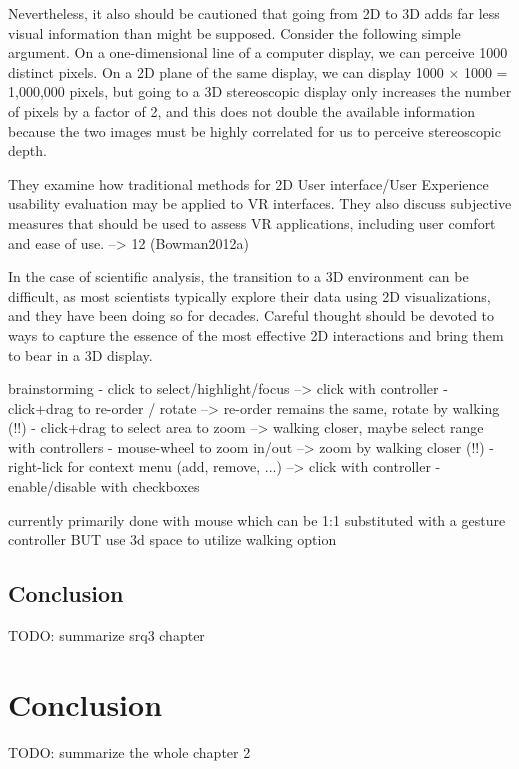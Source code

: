 Nevertheless, it also should be cautioned that going from 2D to 3D adds far less visual information than might be supposed. Consider the following simple argument. On a one-dimensional line of a computer display, we can perceive 1000 distinct pixels. On a 2D plane of the same display, we can display 1000 × 1000 = 1,000,000 pixels, but going to a 3D stereoscopic display only increases the number of pixels by a factor of 2, and this does not double the available information because the two images must be highly correlated for us to perceive stereoscopic depth.
\cite{Ware2012}

They examine how traditional methods for 2D User interface/User Experience usability evaluation may be applied to VR interfaces. They also discuss subjective measures that should be used to assess VR applications, including user comfort and ease of use. --> 12 (Bowman2012a)
\cite{Drouhard2015}

In the case of scientific analysis, the transition to a 3D environment can be difficult, as most scientists typically explore their data using 2D visualizations, and they have been doing so for decades. Careful thought should be devoted to ways to capture the essence of the most effective 2D interactions and bring them to bear in a 3D display.
\cite{Drouhard2015}


brainstorming
- click to select/highlight/focus   --> click with controller
- click+drag to re-order / rotate	--> re-order remains the same, rotate by walking (!!)
- click+drag to select area to zoom   --> walking closer, maybe select range with controllers
- mouse-wheel to zoom in/out   --> zoom by walking closer (!!)
- right-lick for context menu (add, remove, ...)   --> click with controller
- enable/disable with checkboxes

currently primarily done with mouse which can be 1:1 substituted with a gesture controller
BUT use 3d space to utilize walking option



\subsection{Conclusion}

TODO: summarize srq3 chapter





\section{Conclusion}

\label{SectionLiteratureReviewConclusion}

TODO: summarize the whole chapter 2

